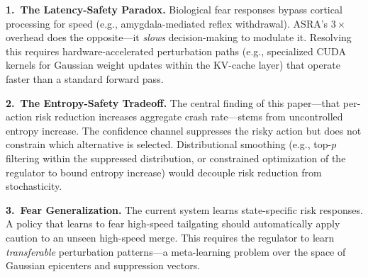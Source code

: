 \documentclass[runningheads]{llncs}
\begin{document}
\textbf{1.\ The Latency-Safety Paradox.} Biological fear responses bypass cortical processing for speed (e.g., amygdala-mediated reflex withdrawal). ASRA's $3\times$ overhead does the opposite---it \emph{slows} decision-making to modulate it. Resolving this requires hardware-accelerated perturbation paths (e.g., specialized CUDA kernels for Gaussian weight updates within the KV-cache layer) that operate faster than a standard forward pass.

\textbf{2.\ The Entropy-Safety Tradeoff.} The central finding of this paper---that per-action risk reduction increases aggregate crash rate---stems from uncontrolled entropy increase. The confidence channel suppresses the risky action but does not constrain which alternative is selected. Distributional smoothing (e.g., top-$p$ filtering within the suppressed distribution, or constrained optimization of the regulator to bound entropy increase) would decouple risk reduction from stochasticity.

\textbf{3.\ Fear Generalization.} The current system learns state-specific risk responses. A policy that learns to fear high-speed tailgating should automatically apply caution to an unseen high-speed merge. This requires the regulator to learn \emph{transferable} perturbation patterns---a meta-learning problem over the space of Gaussian epicenters and suppression vectors.
\end{document}
